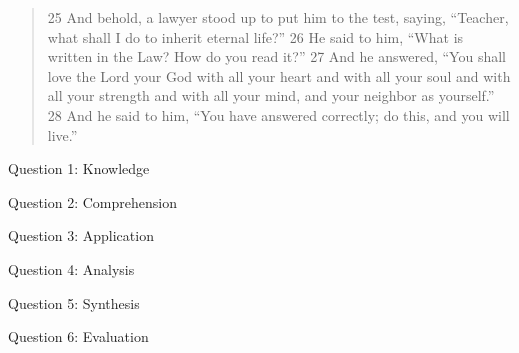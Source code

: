 \begin{quote}
25 And behold, a lawyer stood up to put him to the test, saying, “Teacher, what shall I do to inherit eternal life?” 26 He said to him, “What is written in the Law? How do you read it?” 27 And he answered, “You shall love the Lord your God with all your heart and with all your soul and with all your strength and with all your mind, and your neighbor as yourself.” 28 And he said to him, “You have answered correctly; do this, and you will live.” 
\end{quote}

\begin{quote}
\lipsum[4] 
\end{quote}

\discussion

\lipsum[5-7]

\questions

Question 1: Knowledge
\vfill

Question 2: Comprehension
\vfill

Question 3: Application
\vfill

Question 4: Analysis
\vfill

Question 5: Synthesis
\vfill

Question 6: Evaluation
\vfill